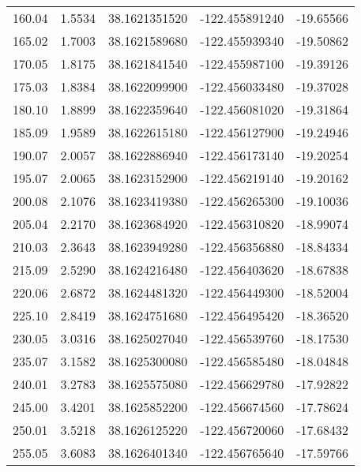 \begin{longtable}{p{2.5cm}p{2.5cm}p{3cm}p{3cm}p{2.5cm}}
       160.04  & 	 1.5534 &               38.1621351520  &   -122.455891240   &	-19.65566 \\
       165.02  & 	 1.7003 &               38.1621589680  &   -122.455939340   &	-19.50862 \\
       170.05  & 	 1.8175 &               38.1621841540  &   -122.455987100   &	-19.39126 \\
       175.03  & 	 1.8384 &               38.1622099900  &   -122.456033480   &	-19.37028 \\
       180.10  & 	 1.8899 &               38.1622359640  &   -122.456081020   &	-19.31864 \\
       185.09  & 	 1.9589 &               38.1622615180  &   -122.456127900   &	-19.24946 \\
       190.07  & 	 2.0057 &               38.1622886940  &   -122.456173140   &	-19.20254 \\
       195.07  & 	 2.0065 &               38.1623152900  &   -122.456219140   &	-19.20162 \\
       200.08  & 	 2.1076 &               38.1623419380  &   -122.456265300   &	-19.10036 \\
       205.04  & 	 2.2170 &               38.1623684920  &   -122.456310820   &	-18.99074 \\
       210.03  & 	 2.3643 &               38.1623949280  &   -122.456356880   &	-18.84334 \\
       215.09  & 	 2.5290 &               38.1624216480  &   -122.456403620   &	-18.67838 \\
       220.06  & 	 2.6872 &               38.1624481320  &   -122.456449300   &	-18.52004 \\
       225.10  & 	 2.8419 &               38.1624751680  &   -122.456495420   &	-18.36520 \\
       230.05  & 	 3.0316 &               38.1625027040  &   -122.456539760   &	-18.17530 \\
       235.07  & 	 3.1582 &               38.1625300080  &   -122.456585480   &	-18.04848 \\
       240.01  & 	 3.2783 &               38.1625575080  &   -122.456629780   &	-17.92822 \\
       245.00  & 	 3.4201 &               38.1625852200  &   -122.456674560   &	-17.78624 \\
       250.01  & 	 3.5218 &               38.1626125220  &   -122.456720060   &	-17.68432 \\
       255.05  & 	 3.6083 &               38.1626401340  &   -122.456765640   &	-17.59766 \\

\end{longtable}
